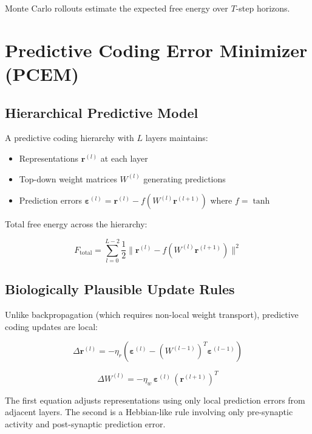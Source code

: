 \documentclass[11pt]{article}
\theoremstyle{plain}
\begin{document}
Monte Carlo rollouts estimate the expected free energy over \( T \)-step horizons.


\section{Predictive Coding Error Minimizer (PCEM)}

\subsection{Hierarchical Predictive Model}

A predictive coding hierarchy with \( L \) layers maintains:

\begin{itemize}
  \item Representations \( \mathbf{r}^{(l)} \) at each layer
  \item Top-down weight matrices \( W^{(l)} \) generating predictions
  \item Prediction errors \( \boldsymbol{\varepsilon}^{(l)} = \mathbf{r}^{(l)} - f(W^{(l)} \mathbf{r}^{(l+1)}) \) where \( f = \tanh \)
\end{itemize}

Total free energy across the hierarchy:

\begin{equation}
F_{\text{total}} = \sum_{l=0}^{L-2} \frac{1}{2} \|\mathbf{r}^{(l)} - f(W^{(l)} \mathbf{r}^{(l+1)})\|^2
\end{equation}

\subsection{Biologically Plausible Update Rules}

Unlike backpropagation (which requires non-local weight transport), predictive coding updates are local:

\begin{equation}
\Delta \mathbf{r}^{(l)} = -\eta_r \left( \boldsymbol{\varepsilon}^{(l)} - (W^{(l-1)})^T \boldsymbol{\varepsilon}^{(l-1)} \right)
\end{equation}

\begin{equation}
\Delta W^{(l)} = -\eta_w \, \boldsymbol{\varepsilon}^{(l)} \, (\mathbf{r}^{(l+1)})^T
\end{equation}

The first equation adjusts representations using only local prediction errors from adjacent layers. The second is a Hebbian-like rule involving only pre-synaptic activity and post-synaptic prediction error.
\end{document}
